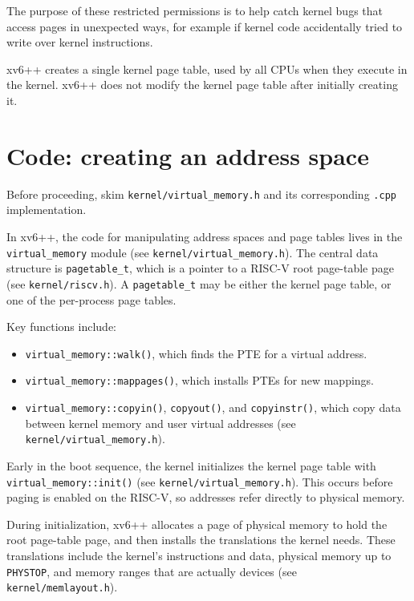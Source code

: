 The purpose of these restricted permissions is to help catch kernel bugs
that access pages in unexpected ways, for example if kernel code
accidentally tried to write over kernel instructions.

xv6++ creates a single kernel page table, used by all CPUs when they
execute in the kernel. xv6++ does not modify the kernel page table after
initially creating it.

\section{Code: creating an address space}

Before proceeding, skim \texttt{kernel/virtual\_memory.h} and its
corresponding \texttt{.cpp} implementation.

In xv6++, the code for manipulating address spaces and page tables lives
in the \texttt{virtual\_memory} module (see \texttt{kernel/virtual\_memory.h}).
The central data structure is \lstinline{pagetable_t}, which is a pointer
to a RISC-V root page-table page (see \texttt{kernel/riscv.h}). A
\lstinline{pagetable_t} may be either the kernel page table, or one of
the per-process page tables.

Key functions include:
\begin{itemize}
\item \lstinline{virtual_memory::walk()}, which finds the PTE for a virtual address.
\item \lstinline{virtual_memory::mappages()}, which installs PTEs for new mappings.
\item \lstinline{virtual_memory::copyin()}, \lstinline{copyout()}, and \lstinline{copyinstr()},
      which copy data between kernel memory and user virtual addresses (see \texttt{kernel/virtual\_memory.h}).
\end{itemize}

Early in the boot sequence, the kernel initializes the kernel page table
with \lstinline{virtual_memory::init()} (see \texttt{kernel/virtual\_memory.h}).
This occurs before paging is enabled on the RISC-V, so addresses refer
directly to physical memory.

During initialization, xv6++ allocates a page of physical memory to hold
the root page-table page, and then installs the translations the kernel
needs. These translations include the kernel's instructions and data,
physical memory up to \lstinline{PHYSTOP}, and memory ranges that are
actually devices (see \texttt{kernel/memlayout.h}).


